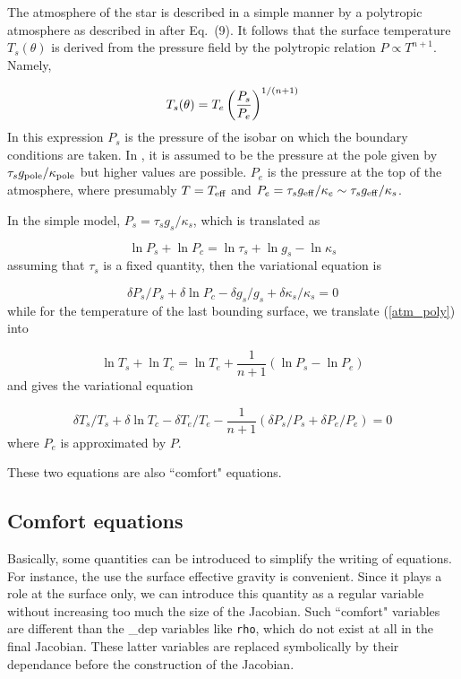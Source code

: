 The atmosphere of the star is described in a simple manner by a polytropic
atmosphere as described in \cite{ELR13} after Eq.~(9). It follows that
the surface temperature $T_s(\theta)$ is derived from the pressure field
by the polytropic relation $P\propto T^{n+1}$. Namely,

\begin{equation}
T_s(\theta) = T_e\left(\frac{P_s}{P_e}\right)^{1/(n+1)}
\label{atm_poly}
\end{equation}
In this expression $P_s$ is the pressure of the isobar on which the
boundary conditions are taken. In \cite{ELR13}, it is assumed to be the
pressure at the pole given by $\tau_sg_{\rm pole}/\kappa_{\rm pole}$
but higher values are possible. $P_e$ is the pressure at the top of
the atmosphere, where presumably $T=T_{\rm eff}$ and $P_e=\tau_sg_{\rm
eff}/\kappa_e\sim\tau_sg_{\rm eff}/\kappa_s$.

In the simple model, $P_s=\tau_sg_s/\kappa_s$, which is translated as

\[ \ln P_s+\ln P_c = \ln\tau_s +\ln g_s -\ln\kappa_s\]
assuming that $\tau_s$ is a fixed quantity, then the variational equation is 

\begin{equation}
\delta P_s/P_s + \delta\ln P_c - \delta g_s/g_s +\delta\kappa_s/\kappa_s = 0
\end{equation}
while for the temperature of the last bounding surface, we translate
(\ref{atm_poly}) into

\[ \ln T_s + \ln T_c = \ln T_e + \frac{1}{n+1}(\ln P_s - \ln P_e)\]
and gives the variational equation

\begin{equation}
\delta T_s/T_s + \delta\ln T_c -\delta T_e/T_e -\frac{1}{n+1}(\delta
P_s/P_s+\delta P_e/P_e) = 0
\end{equation}
where $P_e$ is approximated by $P$.

These two equations are also ``comfort" equations.

\subsection{Comfort equations}\label{comf_eq}

Basically, some quantities can be introduced to simplify the writing of
equations. For instance, the use the surface effective gravity is convenient.
Since it plays a role at the surface only, we can introduce this
quantity as a regular variable without increasing too much the size of the
Jacobian. Such ``comfort" variables are different than the \_dep variables
like {\tt rho}, which do not exist at all in the final Jacobian. These
latter variables are replaced symbolically by their dependance before
the construction of the Jacobian.

